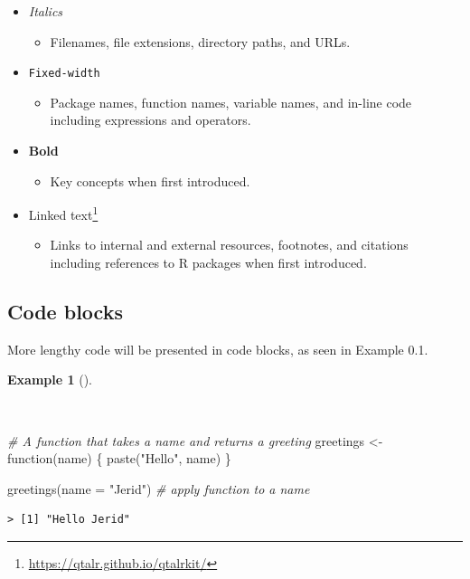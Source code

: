 \documentclass[
  letterpaper,
]{latex/krantz}
\newenvironment{Shaded}{\begin{snugshade}}{\end{snugshade}}
\newcommand{\AttributeTok}[1]{\textcolor[rgb]{0.00,0.00,0.00}{#1}}
\newcommand{\CommentTok}[1]{\textcolor[rgb]{0.00,0.00,0.00}{\textit{#1}}}
\newcommand{\ControlFlowTok}[1]{\textcolor[rgb]{0.00,0.00,0.00}{#1}}
\newcommand{\FunctionTok}[1]{\textcolor[rgb]{0.00,0.00,0.00}{#1}}
\newcommand{\NormalTok}[1]{\textcolor[rgb]{0.00,0.00,0.00}{#1}}
\newcommand{\OtherTok}[1]{\textcolor[rgb]{0.00,0.00,0.00}{#1}}
\newcommand{\StringTok}[1]{\textcolor[rgb]{0.00,0.00,0.00}{#1}}
\providecommand{\tightlist}{%
  \setlength{\itemsep}{0pt}\setlength{\parskip}{0pt}}\usepackage{longtable,booktabs,array}
\theoremstyle{definition}
\newtheorem{example}{Example}[chapter]
\theoremstyle{remark}
\DeclareRobustCommand{\href}[2]{#2\footnote{\url{#1}}}
\begin{document}
\begin{itemize}
\tightlist
\item
  \emph{Italics}

  \begin{itemize}
  \tightlist
  \item
    Filenames, file extensions, directory paths, and URLs.
  \end{itemize}
\item
  \texttt{Fixed-width}

  \begin{itemize}
  \tightlist
  \item
    Package names, function names, variable names, and in-line code
    including expressions and operators.
  \end{itemize}
\item
  \textbf{Bold}

  \begin{itemize}
  \tightlist
  \item
    Key concepts when first introduced.
  \end{itemize}
\item
  \href{https://qtalr.github.io/qtalrkit/}{Linked text}

  \begin{itemize}
  \tightlist
  \item
    Links to internal and external resources, footnotes, and citations
    including references to R packages when first introduced.
  \end{itemize}
\end{itemize}

\subsection*{Code blocks}\label{sec-p-code-blocks}

More lengthy code will be presented in code blocks, as seen in Example
0.1.

\begin{example}[]\protect\hypertarget{exm-code-block}{}\label{exm-code-block}

~

\begin{Shaded}
\begin{Highlighting}[]
\CommentTok{\# A function that takes a name and returns a greeting}
\NormalTok{greetings }\OtherTok{\textless{}{-}} \ControlFlowTok{function}\NormalTok{(name) \{}
  \FunctionTok{paste}\NormalTok{(}\StringTok{"Hello"}\NormalTok{, name)}
\NormalTok{\}}

\FunctionTok{greetings}\NormalTok{(}\AttributeTok{name =} \StringTok{"Jerid"}\NormalTok{) }\CommentTok{\# apply function to a name}
\end{Highlighting}
\end{Shaded}

\begin{verbatim}
> [1] "Hello Jerid"
\end{verbatim}

\end{example}
\end{document}
